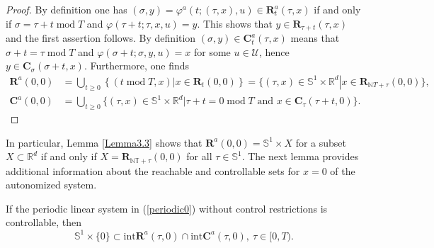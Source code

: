 \documentclass{siamltex}%
\begin{document}
\begin{proof}
By definition one has $(\sigma,y)=\varphi^{a}(t;(\tau,x),u)\in\mathbf{R}%
_{t}^{a}(\tau,x)$ if and only if $\sigma=\tau+t\operatorname{mod}T$ and
$\varphi(\tau+t;\tau,x,u)=y$. This shows that $y\in\mathbf{R}_{\tau+t}%
(\tau,x)$ and the first assertion follows. By definition $(\sigma
,y)\in\mathbf{C}_{t}^{a}(\tau,x)$ means that $\sigma+t=\tau\operatorname{mod}%
T$ and $\varphi(\sigma+t;\sigma,y,u)=x$ for some $u\in\mathcal{U}$, hence
$y\in\mathbf{C}_{\sigma}(\sigma+t,x)$. Furthermore, one finds%
\begin{align*}
\mathbf{R}^{a}(0,0)  &  =\bigcup\nolimits_{t\geq0}\left\{
(t\operatorname{mod}T,x)\left\vert x\in\mathbf{R}_{t}(0,0)\right.  \right\}
=\{(\tau,x)\in\mathbb{S}^{1}\times\mathbb{R}^{d}\left\vert x\in\mathbf{R}%
_{\mathbb{N}T+\tau}(0,0)\right.  \},\\
\mathbf{C}^{a}(0,0)  &  =\bigcup\nolimits_{t\geq0}\{(\tau,x)\in\mathbb{S}%
^{1}\times\mathbb{R}^{d}\left\vert \tau+t=0\operatorname{mod}T\text{ and }%
x\in\mathbf{C}_{\tau}(\tau+t,0)\right.  \}.
\end{align*}

\end{proof}

In particular, Lemma \ref{Lemma3.3} shows that $\mathbf{R}^{a}(0,0)=\mathbb{S}%
^{1}\times X$ for a subset $X\subset\mathbb{R}^{d}$ if and only if
$X=\mathbf{R}_{\mathbb{NT+\tau}}(0,0)$ for all $\tau\in\mathbb{S}^{1}$. The
next lemma provides additional information about the reachable and
controllable sets for $x=0$ of the autonomized system.

\begin{lemma}
\label{Lemma3.4}If the periodic linear system in (\ref{periodic0}) without
control restrictions is controllable, then%
\[
\mathbb{S}^{1}\times\{0\}\subset\mathrm{int}\mathbf{R}^{a}(\tau,0)\cap
\mathrm{int}\mathbf{C}^{a}(\tau,0),~\tau\in\lbrack0,T).
\]

\end{lemma}
\end{document}
